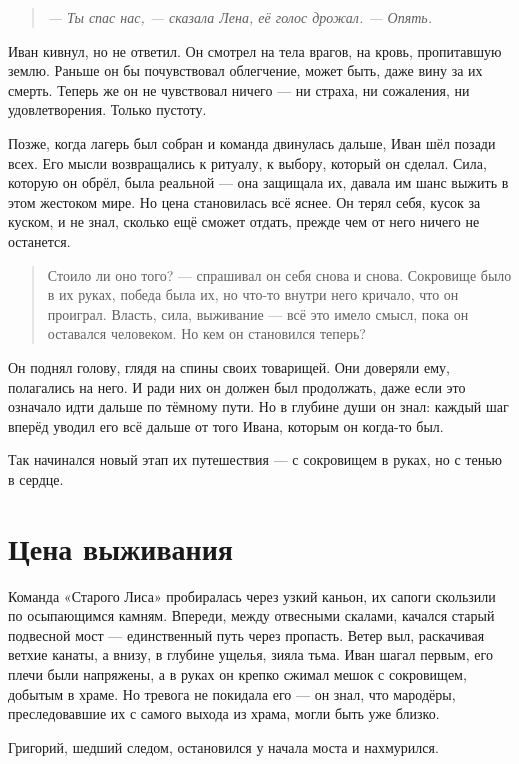 \documentclass[12pt,a4paper]{book}
\newenvironment{dialogue}{\begin{quote}\itshape}{\end{quote}} %
\begin{document}
\begin{dialogue}
--- Ты спас нас, --- сказала Лена, её голос дрожал. --- Опять.
\end{dialogue}

Иван кивнул, но не ответил. Он смотрел на тела врагов, на кровь, пропитавшую землю. Раньше он бы почувствовал облегчение, может быть, даже вину за их смерть. Теперь же он не чувствовал ничего --- ни страха, ни сожаления, ни удовлетворения. Только пустоту.

Позже, когда лагерь был собран и команда двинулась дальше, Иван шёл позади всех. Его мысли возвращались к ритуалу, к выбору, который он сделал. Сила, которую он обрёл, была реальной --- она защищала их, давала им шанс выжить в этом жестоком мире. Но цена становилась всё яснее. Он терял себя, кусок за куском, и не знал, сколько ещё сможет отдать, прежде чем от него ничего не останется.

\begin{quote}
Стоило ли оно того? --- спрашивал он себя снова и снова. Сокровище было в их руках, победа была их, но что-то внутри него кричало, что он проиграл. Власть, сила, выживание --- всё это имело смысл, пока он оставался человеком. Но кем он становился теперь?
\end{quote}

Он поднял голову, глядя на спины своих товарищей. Они доверяли ему, полагались на него. И ради них он должен был продолжать, даже если это означало идти дальше по тёмному пути. Но в глубине души он знал: каждый шаг вперёд уводил его всё дальше от того Ивана, которым он когда-то был.

Так начинался новый этап их путешествия --- с сокровищем в руках, но с тенью в сердце.

\chapter{Цена выживания}

Команда «Старого Лиса» пробиралась через узкий каньон, их сапоги скользили по осыпающимся камням. Впереди, между отвесными скалами, качался старый подвесной мост --- единственный путь через пропасть. Ветер выл, раскачивая ветхие канаты, а внизу, в глубине ущелья, зияла тьма. Иван шагал первым, его плечи были напряжены, а в руках он крепко сжимал мешок с сокровищем, добытым в храме. Но тревога не покидала его --- он знал, что мародёры, преследовавшие их с самого выхода из храма, могли быть уже близко.

Григорий, шедший следом, остановился у начала моста и нахмурился.
\end{document}
